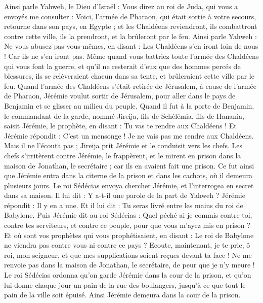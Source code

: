 \begin{multicols}{2}
Ainsi parle Yahweh, le Dieu d'Israël : Vous direz au roi de Juda, qui vous a envoyés me consulter : Voici, l'armée de Pharaon, qui était sortie à votre secours, retourne dans son pays, en Egypte ;
et les Chaldéens reviendront, ils combattront contre cette ville, ils la prendront, et la brûleront par le feu.
Ainsi parle Yahweh : Ne vous abusez pas vous-mêmes, en disant : Les Chaldéens s’en iront loin de nous ! Car ils ne s'en iront pas.
Même quand vous battriez toute l'armée des Chaldéens qui vous font la guerre, et qu'il ne resterait d’eux que des hommes percés de blessures, ils se relèveraient chacun dans sa tente, et brûleraient cette ville par le feu.
Quand l'armée des Chaldéens s’était retirée de Jérusalem, à cause de l'armée de Pharaon,
Jérémie voulut sortir de Jérusalem, pour aller dans le pays de Benjamin et se glisser au milieu du peuple.
Quand il fut à la porte de Benjamin, le commandant de la garde, nommé Jireija, fils de Schélémia, fils de Hanania, saisit Jérémie, le prophète, en disant : Tu vas te rendre aux Chaldéens !
Et Jérémie répondit : C'est un mensonge !  Je ne vais pas me rendre aux Chaldéens. Mais il ne l'écouta pas ; Jireija prit Jérémie et le conduisit vers les chefs.
Les chefs s’irritèrent contre Jérémie, le frappèrent, et le mirent en prison dans la maison de Jonathan, le secrétaire ; car ils en avaient fait une prison.
Ce fut ainsi que Jérémie entra dans la citerne de la prison et dans les cachots, où il demeura plusieurs jours.
Le roi Sédécias envoya chercher Jérémie, et l'interrogea en secret dans sa maison. Il lui dit : Y a-t-il une parole de la part de Yahweh ? Jérémie répondit : Il y en a une. Et il lui dit : Tu seras livré entre les mains du roi de Babylone.
Puis Jérémie dit au roi Sédécias : Quel péché ai-je commis contre toi, contre tes serviteurs, et contre ce peuple, pour que vous m'ayez mis en prison ?
Et où sont vos prophètes qui vous prophétisaient, en disant : Le roi de Babylone ne viendra pas contre vous ni contre ce pays ?
Ecoute, maintenant, je te prie, ô roi, mon seigneur, et que mes supplications soient reçues devant ta face ! Ne me renvoie pas dans la maison de Jonathan, le secrétaire, de peur que je n'y meure !
Le roi Sédécias ordonna qu'on garde Jérémie dans la cour de la prison, et qu'on lui donne chaque jour un pain de la rue des boulangers, jusqu’à ce que tout le pain de la ville soit épuisé. Ainsi Jérémie demeura dans la cour de la prison.

\end{multicols}
